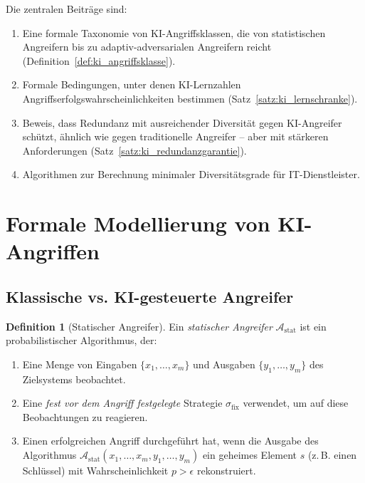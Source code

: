 \documentclass[a4paper,12pt]{article}
\theoremstyle{definition}
\newtheorem{definition}{Definition}
\newcommand{\A}{\mathcal{A}}
\begin{document}
Die zentralen Beiträge sind:

\begin{enumerate}
	\item Eine formale Taxonomie von KI-Angriffsklassen, die von statistischen Angreifern bis zu adaptiv-adversarialen Angreifern reicht (Definition~\ref{def:ki_angriffsklasse}).
	\item Formale Bedingungen, unter denen KI-Lernzahlen Angriffserfolgswahrscheinlichkeiten bestimmen (Satz~\ref{satz:ki_lernschranke}).
	\item Beweis, dass Redundanz mit ausreichender Diversität gegen KI-Angreifer schützt, ähnlich wie gegen traditionelle Angreifer -- aber mit stärkeren Anforderungen (Satz~\ref{satz:ki_redundanzgarantie}).
	\item Algorithmen zur Berechnung minimaler Diversitätsgrade für IT-Dienstleister.
\end{enumerate}

\section{Formale Modellierung von KI-Angriffen}

\subsection{Klassische vs. KI-gesteuerte Angreifer}

\begin{definition}[Statischer Angreifer]
\label{def:statischer_angreifer}
Ein \emph{statischer Angreifer} $\A_{\mathrm{stat}}$ ist ein probabilistischer Algorithmus, der:
\begin{enumerate}
	\item Eine Menge von Eingaben $\{x_1, \ldots, x_m\}$ und Ausgaben $\{y_1, \ldots, y_m\}$ des Zielsystems beobachtet.
	\item Eine \emph{fest vor dem Angriff festgelegte} Strategie $\sigma_{\mathrm{fix}}$ verwendet, um auf diese Beobachtungen zu reagieren.
	\item Einen erfolgreichen Angriff durchgeführt hat, wenn die Ausgabe des Algorithmus $\A_{\mathrm{stat}}(x_1, \ldots, x_m, y_1, \ldots, y_m)$ ein geheimes Element $s$ (z.\,B. einen Schlüssel) mit Wahrscheinlichkeit $p > \epsilon$ rekonstruiert.
\end{enumerate}
\end{definition}
\end{document}
